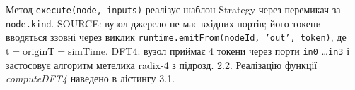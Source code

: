 \documentclass[
]{article}
\newcommand{\passthrough}[1]{#1}
\begin{document}
Метод
\passthrough{\lstinline!execute!}\passthrough{\lstinline!(!}\passthrough{\lstinline!node!}\passthrough{\lstinline!,!}\passthrough{\lstinline! !}\passthrough{\lstinline!inputs!}\passthrough{\lstinline!)!}
реалізує шаблон Strategy через перемикач за
\passthrough{\lstinline!node!}\passthrough{\lstinline!.!}\passthrough{\lstinline!kind!}.
SOURCE: вузол-джерело не має вхідних портів; його токени вводяться
ззовні через виклик
\passthrough{\lstinline!runtime!}\passthrough{\lstinline!.!}\passthrough{\lstinline!emitFrom!}\passthrough{\lstinline!(!}\passthrough{\lstinline!nodeId!}\passthrough{\lstinline!,!}\passthrough{\lstinline! !}\passthrough{\lstinline!’!}\passthrough{\lstinline!out!}\passthrough{\lstinline!’,!}\passthrough{\lstinline! !}\passthrough{\lstinline!token!}\passthrough{\lstinline!)!},
де \(\text{t} = \text{originT} = \text{simTime}\). DFT4: вузол приймає 4
токени через порти
\passthrough{\lstinline!in!}\passthrough{\lstinline!0!}
\ldots{}\passthrough{\lstinline!in!}\passthrough{\lstinline!3!} і
застосовує алгоритм метелика radix-4 з підрозд. 2.2. Реалізацію функції
\emph{computeDFT4} наведено в лістингу 3.1.
\end{document}
